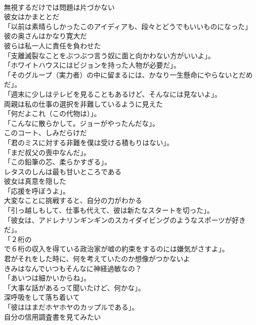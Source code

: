 \documentclass[8pt]{extreport}
\begin{document}
\begin{CJK}{UTF8}{min}
\\	無視するだけでは問題は片づかない	
\\	彼女はかまととだ	
\\	「以前は素晴らしかったこのアイディアも、段々とどうでもいいものになった」	
\\	彼の奥さんはかなり寛大だ	
\\	彼らは私一人に責任を負わせた	
\\	「支離滅裂なことをぶつぶつ言う奴に面と向かわない方がいいよ」。	
\\	「ホワイトハウスにはビジョンを持った人物が必要だ」。	
\\	「そのグループ（実力者）の中に留まるには、かなり一生懸命にやらないとだめだ」。	
\\	「週末に少しはテレビを見ることもあるけど、そんなには見ないよ」。	
\\	両親は私の仕事の選択を非難しているように見えた	
\\	「何だよこれ（この代物は）」。	
\\	「こんなに散らかして。ジョーがやったんだな」。	
\\	このコート、しみだらけだ	
\\	「君のミスに対する非難を僕は受ける積もりはない」。	
\\	「まだ叔父の喪中なんだ」。	
\\	「この鉛筆の芯、柔らかすぎる」。	
\\	レタスのしんは最も甘いところである	
\\	彼女は真意を隠した	
\\	「応援を呼ぼうよ」。	
\\	大変なことに挑戦すると、自分の力がわかる	
\\	「引っ越しもして、仕事も代えて、彼は新たなスタートを切った」。	
\\	「彼女は、アドレナリンギンギンのスカイダイビングのようなスポーツが好きだ」。	
\\	「２桁の
\\	で６桁の収入を得ている政治家が嘘の約束をするのには嫌気がさすよ」。	
\\	君がそれをした時に、何を考えていたのか想像がつかないよ	
\\	きみはなんでいつもそんなに神経過敏なの？	
\\	「あいつは細かいからね」。	
\\	「大事な話があるって聞いたけど、何かな」。	
\\	深呼吸をして落ち着いて	
\\	「彼ははまだホヤホヤのカップルである」。	
\\	自分の信用調査書を見てみたい	

\end{CJK}
\end{document}
